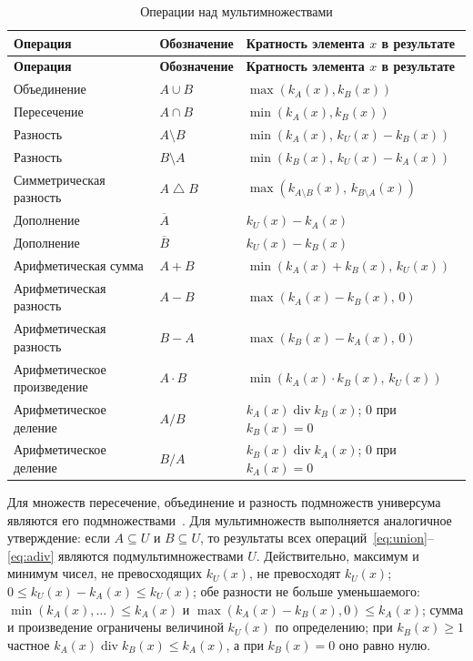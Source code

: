 \documentclass[14pt,a4paper]{extarticle}
\newcommand{\kA}{k_A(x)}
\newcommand{\kB}{k_B(x)}
\newcommand{\kU}{k_U(x)}
\begin{document}
{\small
\begin{longtable}{|P{5.0cm}|P{2.7cm}|P{7.3cm}|}
\caption{Операции над мультимножествами}\label{tab:ops}\\
\hline
\textbf{Операция} & \textbf{Обозначение} & \textbf{Кратность элемента $x$ в результате}\\\hline
\endfirsthead
\hline
\textbf{Операция} & \textbf{Обозначение} & \textbf{Кратность элемента $x$ в результате}\\\hline
\endhead
Объединение & $A \cup B$ & $\max(\kA, \kB)$ \\\hline
Пересечение & $A \cap B$ & $\min(\kA, \kB)$ \\\hline
Разность & $A \setminus B$ & $\min(\kA,\, \kU - \kB)$ \\\hline
Разность & $B \setminus A$ & $\min(\kB,\, \kU - \kA)$ \\\hline
Симметрическая разность & $A \mathbin{\triangle} B$ & $\max(k_{A \setminus B}(x),\, k_{B \setminus A}(x))$ \\\hline
Дополнение & $\overline{A}$ & $\kU - \kA$ \\\hline
Дополнение & $\overline{B}$ & $\kU - \kB$ \\\hline
Арифметическая сумма & $A + B$ & $\min(\kA + \kB,\, \kU)$ \\\hline
Арифметическая разность & $A - B$ & $\max(\kA - \kB,\, 0)$ \\\hline
Арифметическая разность & $B - A$ & $\max(\kB - \kA,\, 0)$ \\\hline
Арифметическое произведение & $A \cdot B$ & $\min(\kA \cdot \kB,\, \kU)$ \\\hline
Арифметическое деление & $A / B$ & $\kA \operatorname{div} \kB$; $0$ при $\kB = 0$ \\\hline
Арифметическое деление & $B / A$ & $\kB \operatorname{div} \kA$; $0$ при $\kA = 0$ \\\hline
\end{longtable}
}

Для множеств пересечение, объединение и разность подмножеств универсума являются его подмножествами~\cite{novikov}. Для мультимножеств выполняется аналогичное утверждение: если $A \subseteq U$ и $B \subseteq U$, то результаты всех операций~\eqref{eq:union}--\eqref{eq:adiv} являются подмультимножествами $U$. Действительно, максимум и минимум чисел, не превосходящих $\kU$, не превосходят $\kU$; $0 \leqslant \kU - \kA \leqslant \kU$; обе разности не больше уменьшаемого: $\min(\kA, \ldots) \leqslant \kA$ и $\max(\kA - \kB, 0) \leqslant \kA$; сумма и произведение ограничены величиной $\kU$ по определению; при $\kB \geqslant 1$ частное $\kA \operatorname{div} \kB \leqslant \kA$, а при $\kB = 0$ оно равно нулю.
\end{document}
